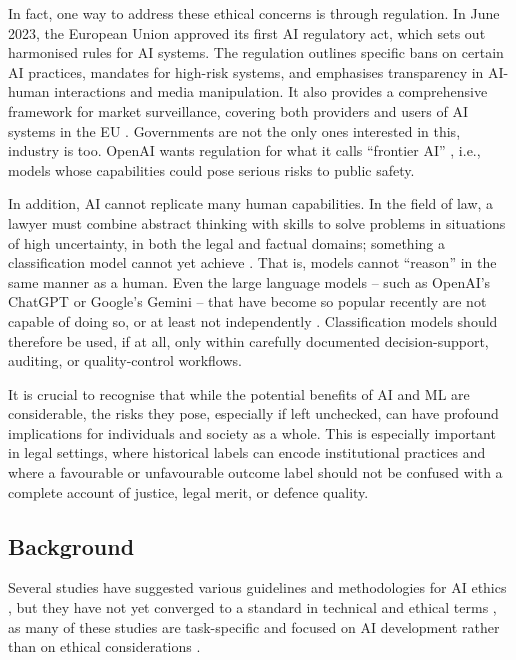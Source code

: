 \documentclass[fleqn,10pt]{wlscirep}
\begin{document}
In fact, one way to address these ethical concerns is through regulation. In June 2023, the European Union approved its first AI regulatory act, which sets out harmonised rules for AI systems. The regulation outlines specific bans on certain AI practices, mandates for high-risk systems, and emphasises transparency in AI-human interactions and media manipulation. It also provides a comprehensive framework for market surveillance, covering both providers and users of AI systems in the EU \cite{eu-52021PC0206}.  Governments are not the only ones interested in this, industry is too. OpenAI wants regulation for what it calls ``frontier AI'' \cite{anderljung2023frontier}, i.e., models whose capabilities could pose serious risks to public safety. 

In addition, AI cannot replicate many human capabilities. In the field of law, a lawyer must combine abstract thinking with skills to solve problems in situations of high uncertainty, in both the legal and factual domains; something a classification model cannot yet achieve \cite{surden2014machine}. That is, models cannot ``reason'' in the same manner as a human. Even the large language models -- such as OpenAI's ChatGPT or Google's Gemini -- that have become so popular recently are not capable of doing so, or at least not independently \cite{hao2023reasoning,wei2023chainofthought}. Classification models should therefore be used, if at all, only within carefully documented decision-support, auditing, or quality-control workflows.

It is crucial to recognise that while the potential benefits of AI and ML are considerable, the risks they pose, especially if left unchecked, can have profound implications for individuals and society as a whole. This is especially important in legal settings, where historical labels can encode institutional practices and where a favourable or unfavourable outcome label should not be confused with a complete account of justice, legal merit, or defence quality.

\subsection{Background}

Several studies have suggested various guidelines and methodologies for AI ethics \cite{Floridi2018,baron2019interpretable,Boddington_2017,Mittelstadt_2019,10.1145/3442188.3445919},  but they have not yet converged to a standard in technical and ethical terms \cite{Hagendorff2020,fjeld2020principled,Jobin2019,zeng2018linking},  as many of these studies are task-specific and focused on AI development rather than on ethical considerations \cite{Ayling2022,Morley2020}.
\end{document}
